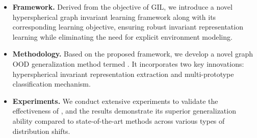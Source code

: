 \begin{itemize}[leftmargin=*]
    \item \textbf{Framework.} Derived from the objective of GIL, we introduce a novel hyperspherical graph invariant learning framework along with its corresponding  learning objective, ensuring robust invariant representation learning while eliminating the need for explicit environment modeling. 
    
    \item \textbf{Methodology.} Based on the proposed framework, we develop a novel graph OOD generalization method termed \ourmethod. It incorporates two key innovations: hyperspherical invariant representation extraction and  multi-prototype classification mechanism.
    
    \item \textbf{Experiments.}  We conduct extensive experiments to validate the effectiveness of \ourmethod, and the results demonstrate its superior generalization ability compared to state-of-the-art methods across various types of distribution shifts.
\end{itemize}


